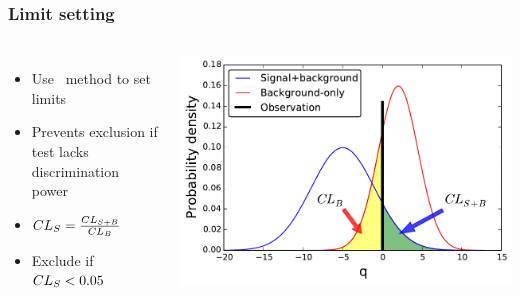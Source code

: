 \documentclass[10pt, svgnames]{beamer}
\begin{document}
\begin{frame}
  \frametitle{Limit setting}
  \begin{columns}
    \begin{itemize}
      \item Use \cls\ method to set limits
      \item Prevents exclusion if test lacks discrimination power
      \item 
        $CL_{S} = \frac{CL_{S+B}}{CL_{B}}$
      \item Exclude if $CL_{S} < 0.05$
    \end{itemize}
    \includegraphics[width=\textwidth]{figures/cls.pdf}
  \end{columns}
\end{frame}
\end{document}

